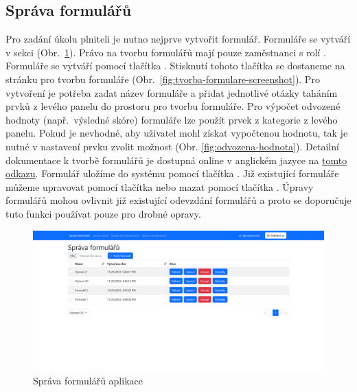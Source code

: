 \subsection{Správa formulářů}\label{subsec:sprava-formularu}

Pro zadání úkolu plniteli je nutno nejprve vytvořit formulář.
Formuláře se vytváří v sekci  (Obr.\ \ref{fig:sprava-formularu-screenshot}).
Právo na tvorbu formulářů mají pouze zaměstnanci s rolí .
Formuláře se vytváří pomocí tlačítka .
Stisknutí tohoto tlačítka se dostaneme na stránku pro tvorbu formuláře (Obr.\ \ref{fig:tvorba-formulare-screenshot}).
Pro vytvoření je potřeba zadat název formuláře a přidat jednotlivé otázky taháním prvků z levého panelu do prostoru pro tvorbu formuláře.
Pro výpočet odvozené hodnoty (např.\ výsledné skóre) formuláře lze použít prvek  z kategorie  z levého panelu.
Pokud je nevhodné, aby uživatel mohl získat vypočtenou hodnotu, tak je nutné v nastavení prvku zvolit možnost  (Obr. \ref{fig:odvozena-hodnota}).
Detailní dokumentace k tvorbě formulářů je dostupná online v anglickém jazyce na \href{https://help.form.io/userguide/form-building}{tomto odkazu}.
Formulář uložíme do systému pomocí tlačítka .
Již existující formuláře můžeme upravovat pomocí tlačítka  nebo mazat pomocí tlačítka .
Úpravy formulářů mohou ovlivnit již existující odevzdání formulářů a proto se doporučuje tuto funkci používat pouze pro drobné opravy.

\begin{figure}[H]
    \includegraphics[width=\textwidth]{../img/screenshots/sprava-formularu}
    \caption{Správa formulářů aplikace}\label{fig:sprava-formularu-screenshot}
\end{figure}


